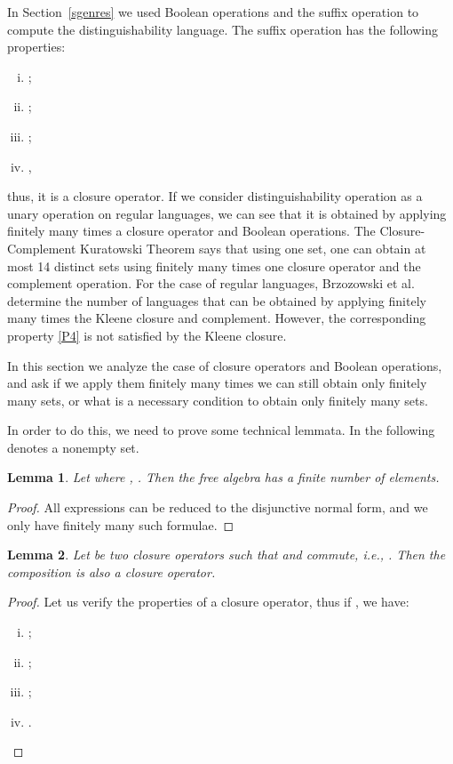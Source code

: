 \documentclass{article}
\newtheorem{lemma}{Lemma}
\begin{document}
In Section~\ref{sgenres} we used Boolean operations and the suffix
operation to compute the distinguishability language. The suffix
operation has the following properties:
\begin{enumerate}[i)]
\item ;
\item ;
\item ;
\item , 
\label{P4}
\end{enumerate}
thus, it is a closure operator.
If we consider distinguishability operation as a unary operation 
on regular languages, we can see that it is obtained by applying 
finitely many times a closure operator and Boolean operations.
 The Closure-Complement Kuratowski Theorem \cite{Kuratowski1922} 
 says that using one set, one can obtain at most 14
 distinct sets using finitely many times one closure operator 
 and the complement operation. 
For the case of regular languages,  
Brzozowski et al. \cite{brzozowski11:_closur_in_formal_languag_and_kurat_theor}
determine the number of languages that can be obtained 
by applying finitely many times the  Kleene closure and complement.
However, the corresponding property \ref{P4} is not satisfied by the Kleene closure.

In this section we analyze the case of closure operators 
and Boolean operations, and ask if we apply them finitely 
many times we can still obtain only finitely many sets, or 
what is a necessary condition to obtain only finitely many sets.

In order to do this, we need to prove some technical lemmata. In the following  denotes a nonempty set.

\begin{lemma}
\label{lfiniteuint}
 Let  where , .
 Then the free algebra  
has a finite number of elements.
 \end{lemma}
\begin{proof}
 All expressions can be reduced to the disjunctive normal form, 
 and we only have finitely many such formulae.
\end{proof}

\begin{lemma}
\label{lcomute}
Let   be
two closure operators such that  and  commute, i.e.,
.
Then the composition  is also a closure operator.  
\end{lemma}
\begin{proof}
Let us verify the properties of a closure operator, thus if 
, we have:
\begin{enumerate}[i)]
\item ;
\item ;
\item ;
\item . 
\end{enumerate}
\end{proof}
\end{document}
